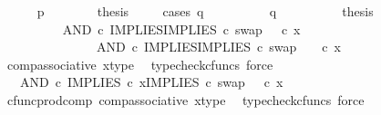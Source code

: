 \begin{isabellebody}
\ \ \ \ \isamarkupfalse%
\ {\isachardoublequoteopen}p\ {\isacharequal}{\kern0pt}\ {\isasymt}{\isachardoublequoteclose}\isanewline
\ \ \ \ \isamarkupfalse%
\ {\isacharquery}{\kern0pt}thesis\isanewline
\ \ \ \ \isamarkupfalse%
{\isacharparenleft}{\kern0pt}cases\ {\isachardoublequoteopen}q\ {\isacharequal}{\kern0pt}\ {\isasymt}{\isachardoublequoteclose}{\isacharparenright}{\kern0pt}\isanewline
\ \ \ \ \ \ \isamarkupfalse%
\ {\isachardoublequoteopen}q\ {\isacharequal}{\kern0pt}\ {\isasymt}{\isachardoublequoteclose}\isanewline
\ \ \ \ \ \ \isamarkupfalse%
\ {\isacharquery}{\kern0pt}thesis\isanewline
\ \ \ \ \ \ \isamarkupfalse%
\ {\isacharminus}{\kern0pt}\ \isanewline
\ \ \ \ \ \ \ \ \isamarkupfalse%
\ {\isachardoublequoteopen}{\isacharparenleft}{\kern0pt}AND\ {\isasymcirc}\isactrlsub c\ {\isasymlangle}IMPLIES{\isacharcomma}{\kern0pt}IMPLIES\ {\isasymcirc}\isactrlsub c\ swap\ {\isasymOmega}\ {\isasymOmega}{\isasymrangle}{\isacharparenright}{\kern0pt}\ {\isasymcirc}\isactrlsub c\ x\ {\isacharequal}{\kern0pt}\ \ \ \ \isanewline
\ \ \ \ \ \ \ \ \ \ \ \ \ \ \ AND\ {\isasymcirc}\isactrlsub c\ {\isasymlangle}IMPLIES{\isacharcomma}{\kern0pt}IMPLIES\ {\isasymcirc}\isactrlsub c\ swap\ {\isasymOmega}\ {\isasymOmega}{\isasymrangle}\ \ {\isasymcirc}\isactrlsub c\ x{\isachardoublequoteclose}\isanewline
\ \ \ \ \ \ \ \ \ \ \isamarkupfalse%
\ comp{\isacharunderscore}{\kern0pt}associative{}\ x{\isacharunderscore}{\kern0pt}type\ \isamarkupfalse%
\ {\isacharparenleft}{\kern0pt}typecheck{\isacharunderscore}{\kern0pt}cfuncs{\isacharcomma}{\kern0pt}\ force{\isacharparenright}{\kern0pt}\isanewline
\ \ \ \ \ \ \ \ \isamarkupfalse%
\ \isamarkupfalse%
\ {\isachardoublequoteopen}{\isachardot}{\kern0pt}{\isachardot}{\kern0pt}{\isachardot}{\kern0pt}\ {\isacharequal}{\kern0pt}\ AND\ {\isasymcirc}\isactrlsub c\ {\isasymlangle}IMPLIES\ {\isasymcirc}\isactrlsub c\ x{\isacharcomma}{\kern0pt}IMPLIES\ {\isasymcirc}\isactrlsub c\ swap\ {\isasymOmega}\ {\isasymOmega}\ {\isasymcirc}\isactrlsub c\ x{\isasymrangle}{\isachardoublequoteclose}\isanewline
\ \ \ \ \ \ \ \ \ \ \isamarkupfalse%
\ cfunc{\isacharunderscore}{\kern0pt}prod{\isacharunderscore}{\kern0pt}comp\ comp{\isacharunderscore}{\kern0pt}associative{}\ x{\isacharunderscore}{\kern0pt}type\ \isamarkupfalse%
\ {\isacharparenleft}{\kern0pt}typecheck{\isacharunderscore}{\kern0pt}cfuncs{\isacharcomma}{\kern0pt}\ force{\isacharparenright}{\kern0pt}\isanewline

\end{isabellebody}
